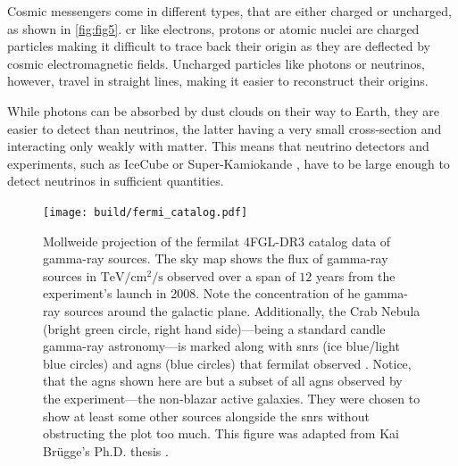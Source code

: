 Cosmic messengers come in different types, that are either charged or uncharged, as shown in \autoref{fig:fig5}.
\gls{cr} like electrons, protons or atomic nuclei are charged particles making it difficult to trace back their origin
as they are deflected by cosmic electromagnetic fields. Uncharged particles like photons or
neutrinos, however, travel in straight lines, making it easier to reconstruct their origins.

While photons can be absorbed by dust clouds on their way to Earth, they are easier to detect than
neutrinos, the latter having a very small cross-section and interacting only weakly with matter.
This means that neutrino detectors and experiments, such as IceCube \cite{icecube_2006} or
Super-Kamiokande \cite{kamiokande}, have to be large enough to detect neutrinos in sufficient quantities.

\begin{figure}
    \centering
    \texttt{[image: build/fermi\_catalog.pdf]}
    \caption{Mollweide projection of the \gls{fermilat} 4FGL-DR3 catalog data of gamma-ray sources. The sky map
    shows the flux of gamma-ray sources in \(\si{\tera\eV\per\centi\meter\squared\per\second}\)
    observed over a span of \(\num{12}\) years from the experiment's launch in 2008. Note the
    concentration of \gls{he} gamma-ray sources around the galactic plane. Additionally,
    the Crab Nebula (bright green circle, right hand side)---being a standard candle gamma-ray astronomy---is marked
    along with \glspl{snr} (ice blue/light blue circles) and \glspl{agn} (blue circles) that \gls{fermilat}
    observed \cite{fermi4fgl, fermi4fgldr3}. Notice, that the \glspl{agn} shown here are but a subset
    of all \glspl{agn} observed by the experiment---the non-blazar active galaxies. They were chosen
    to show at least some other sources alongside the \glspl{snr} without obstructing the plot too much. This
    figure was adapted from Kai Br\"ugge's Ph.D. thesis \cite{bruegge_thesis}.}
    \label{fig:LAT}
\end{figure}

